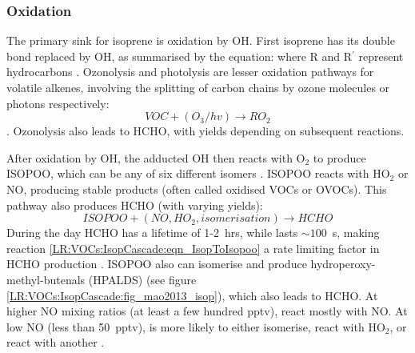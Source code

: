     
    
    \subsubsection{Oxidation}
      \label{LR:VOCs:IsopCascade:Oxidation}
      The primary sink for isoprene is oxidation by OH.
      First isoprene has its double bond replaced by OH, as summarised by the equation:
      where R and R$^{\prime}$ represent hydrocarbons \parencite{Patchen2007}.
      Ozonolysis and photolysis are lesser oxidation pathways for volatile alkenes, involving the splitting of carbon chains by ozone molecules or photons respectively:
      \begin{equation}
        VOC + (O_3/hv) \rightarrow RO_2
      \end{equation}
      \parencite{Nguyen2016,Wolfe2016}.
      Ozonolysis also leads to HCHO, with yields depending on subsequent reactions.
      
      After oxidation by OH, the adducted OH then reacts with O$_2$ to produce ISOPOO, which can be any of six different isomers \parencite{Patchen2007}.
      ISOPOO reacts with HO$_2$ or NO, producing stable products (often called oxidised VOCs or OVOCs).
      This pathway also produces HCHO (with varying yields):
      \begin{equation}
        ISOPOO + (NO, HO_2, isomerisation) \rightarrow HCHO 
      \end{equation}
      During the day HCHO has a lifetime of 1-2~hrs, while \roo lasts $\sim 100$~s, making reaction \ref{LR:VOCs:IsopCascade:eqn_IsopToIsopoo} a rate limiting factor in HCHO production \parencite{Wolfe2016}.
      ISOPOO also can isomerise and produce hydroperoxy-methyl-butenals (HPALDS) (see figure \ref{LR:VOCs:IsopCascade:fig_mao2013_isop}), which also leads to HCHO.
      At higher NO mixing ratios (at least a few hundred pptv), \roo react mostly with NO. 
      At low NO (less than 50~pptv), \roo is more likely to either isomerise, react with HO$_2$, or react with another \roo.
      
      
      

